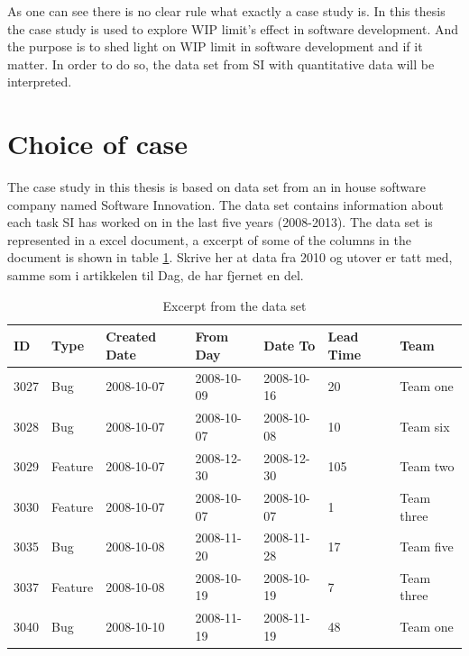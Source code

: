 \documentclass[UKenglish]{ifimaster}  %
\begin{document}

As one can see there is no clear rule what exactly a case study is. In this thesis the case study is used to explore WIP limit's effect in software development.  And the purpose is to shed light on WIP limit in software development and if it matter. In order to do so, the data set from SI with quantitative data will be interpreted.

\section{Choice of case}
\label{sec:coc}
The case study in this thesis is based on data set from an in house software company named Software Innovation. The data set contains information about each task SI has worked on in the last five years (2008-2013). The data set is represented in a excel document, a excerpt of some of the columns in the document is shown in table \ref{dataset}.
Skrive her at data fra 2010 og utover er tatt med, samme som i artikkelen til Dag, de har fjernet en del. 
\begin{table}[!ht]
\begin{center}
\begin{tabular}{|l|l|l|l|l|l|l|}
    \hline
    ID	& Type &  Created Date & From Day & Date To & Lead Time & Team \\ \hline
    3027 & Bug & 2008-10-07 &  2008-10-09 & 2008-10-16 & 20 & Team one\\ \hline
    3028 & Bug  & 2008-10-07 & 2008-10-07 & 2008-10-08 & 10 & Team six\\ \hline
    3029 & Feature & 2008-10-07 &  2008-12-30	 & 2008-12-30 & 105 & Team two\\ \hline
    3030 & Feature & 2008-10-07 & 2008-10-07	& 2008-10-07 & 1& Team three\\ \hline
    3035 & Bug & 2008-10-08 & 2008-11-20 & 2008-11-28 & 17 & Team five\\ \hline
    3037 & Feature & 2008-10-08 &  2008-10-19	 & 2008-10-19 & 7 & Team three\\ \hline
    3040 & Bug & 2008-10-10 &  2008-11-19 & 2008-11-19 & 48 & Team one\\ \hline
    \end{tabular}
\caption{Excerpt from the data set}
\label{dataset}
\end{center}
\end{table}
\newpage
\end{document}
